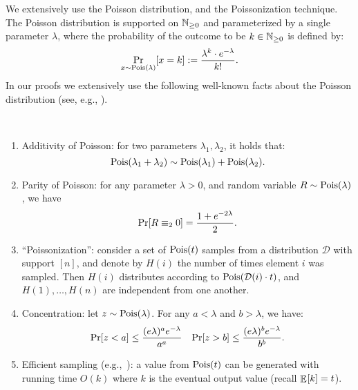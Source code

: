 \documentclass[letter,11pt]{article}
\begin{document}
We extensively use the Poisson distribution, and the Poissonization technique.
The Poisson distribution is supported on $\mathbb{N}_{\geq 0}$ and parameterized by a single parameter $\lambda$, where the probability of the outcome to be $k\in \mathbb{N}_{\geq 0}$ is defined by:
\[
    \Prob{x \sim \poisson{\lambda}}{x = k} := \frac{\lambda^k \cdot e^{-\lambda}}{k!} .
\]
In our proofs we extensively use the following well-known facts about the Poisson distribution (see, e.g., \cite[Section~8.4]{books:probability}).
\begin{fact}
    \label{fact:poisson_properties}~
    \begin{enumerate}
        \item
        Additivity of Poisson: for two parameters $\lambda_1, \lambda_2$, it holds that:
        \[
            \poisson{\lambda_1 + \lambda_2} \sim \poisson{\lambda_1} + \poisson{\lambda_2} .
        \]
        
        \item \label{fact:item:poisson_parity}
        Parity of Poisson: for any parameter $\lambda > 0$, and random variable $R \sim \poisson{\lambda}$, we have
        \[
            \Prob{}{R \equiv_2 0} = \frac{1 + e^{-2\lambda}}{2} .
        \]

        \item \label{fact:item:poissonization}``Poissonization'': consider a set of $\poisson{t}$ samples from a distribution $\mathcal{D}$ with support $[n]$, and denote by $H(i)$ the number of times element $i$ was sampled.
        Then $H(i)$ distributes according to $\poisson{\mathcal{D}(i)\cdot t}$, and $H(1),\dots, H(n)$ are independent from one another.
        
        \item Concentration: let $z\sim \poisson{\lambda}$. For any $a < \lambda$ and $b > \lambda$, we have:
        \[
\begin{aligned}
            \Prob{}{z < a} \leq \frac{(e\lambda)^a e^{-\lambda}}{a^a}
            && \Prob{}{z > b} \leq \frac{(e\lambda)^b e^{-\lambda}}{b^b} .
        \end{aligned}
\]

        \item Efficient sampling (e.g.,~\cite{books:Knuth}): a value from $\poisson{t}$ can be generated with running time $O(k)$ where $k$ is the eventual output value (recall $\Expc{}{k} = t$).
    \end{enumerate}
\end{fact}
\end{document}
